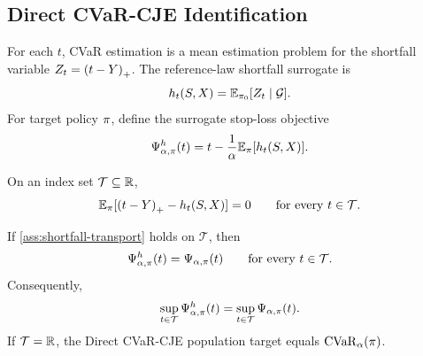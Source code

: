 \begin{twocolproof}
\end{twocolproof}

\subsection{Direct CVaR-CJE Identification}

For each $t$, CVaR estimation is a mean estimation problem for the shortfall
variable $Z_t=\left(t-Y\right)_{+}$. The reference-law shortfall surrogate is
\[
h_t(S,X)=\mathbb{E}_{\pi_{0}}[Z_t\mid\mathcal{G}].
\]
For target policy $\pi$, define the surrogate stop-loss objective
\begin{equation}
\Psi^h_{\alpha,\pi}(t)
=t-\frac{1}{\alpha}\mathbb{E}_\pi[h_t(S,X)].
\label{eq:formal-surrogate-stoploss}
\end{equation}

\begin{assumption}
\label{ass:shortfall-transport}
On an index set $\mathcal{T}\subseteq\mathbb{R}$,
\[
\mathbb{E}_\pi[\left(t-Y\right)_{+}-h_t(S,X)]=0
\qquad\text{for every }t\in\mathcal{T}.
\]
\end{assumption}

\begin{theorem}
\label{thm:formal-cvar-identification}
If \cref{ass:shortfall-transport} holds on $\mathcal{T}$, then
\[
\Psi^h_{\alpha,\pi}(t)=\Psi_{\alpha,\pi}(t)
\qquad\text{for every }t\in\mathcal{T}.
\]
Consequently,
\[
\sup_{t\in\mathcal{T}}\Psi^h_{\alpha,\pi}(t)
=\sup_{t\in\mathcal{T}}\Psi_{\alpha,\pi}(t).
\]
If $\mathcal{T}=\mathbb{R}$, the Direct CVaR-CJE population target equals
$\mathrm{CVaR}_\alpha(\pi)$.
\end{theorem}

